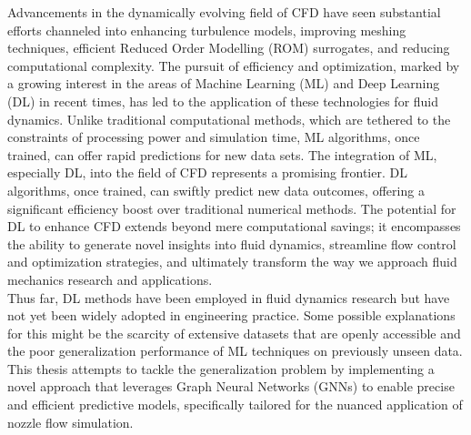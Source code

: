 Advancements in the dynamically evolving field of CFD have seen substantial efforts channeled into enhancing turbulence models, improving meshing techniques, efficient Reduced Order Modelling (ROM) surrogates, and reducing computational complexity. The pursuit of efficiency and optimization, marked by a growing interest in the areas of Machine Learning (ML) and Deep Learning (DL) in recent times, has led to the application of these technologies for fluid dynamics. Unlike traditional computational methods, which are tethered to the constraints of processing power and simulation time, ML algorithms, once trained, can offer rapid predictions for new data sets. The integration of ML, especially DL, into the field of CFD represents a promising frontier. DL algorithms, once trained, can swiftly predict new data outcomes, offering a significant efficiency boost over traditional numerical methods. The potential for DL to enhance CFD extends beyond mere computational savings; it encompasses the ability to generate novel insights into fluid dynamics, streamline flow control and optimization strategies, and ultimately transform the way we approach fluid mechanics research and applications. \\
Thus far, DL methods have been employed in fluid dynamics research but have not yet been widely adopted in engineering practice. Some possible explanations for this might be the scarcity of extensive datasets that are openly accessible and the poor generalization performance of ML techniques on previously unseen data. This thesis attempts to tackle the generalization problem by implementing a novel approach that leverages Graph Neural Networks (GNNs) to enable precise and efficient predictive models, specifically tailored for the nuanced application of nozzle flow simulation.
